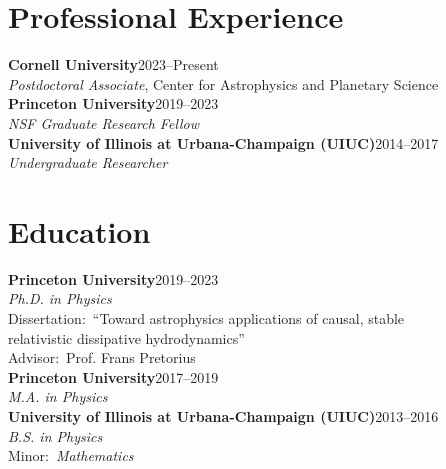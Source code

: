\documentclass[margin,line,11pt]{resume}
\edef\hc{\string:} %
\begin{document}
\begin{resume}

\section{\mysidestyle Professional Experience}

\textbf{Cornell University}\hfill 2023--Present\\
\textit{Postdoctoral Associate}, Center for Astrophysics and Planetary Science \vspace{2mm}\\
\textbf{Princeton University}\hfill 2019--2023\\
\textit{NSF Graduate Research Fellow} \vspace{2mm} \\
\textbf{University of Illinois at Urbana-Champaign (UIUC)}\hfill 2014--2017\\
\textit{Undergraduate Researcher}\\
\vspace{2mm}


\section{\mysidestyle Education}

\textbf{Princeton University}\hfill 2019--2023\\
\textit{Ph.D. in Physics}\\
Dissertation\hc \, ``Toward astrophysics applications of causal, stable \\ 
\hphantom{.}\hspace{24mm}relativistic dissipative hydrodynamics''\\
Advisor\hc ~Prof. Frans Pretorius \vspace{2mm}\\ 
\textbf{Princeton University}\hfill 2017--2019\\
\textit{M.A. in Physics}\vspace{2mm} \\ 
\textbf{University of Illinois at Urbana-Champaign (UIUC)}\hfill 2013--2016\\
\textit{B.S. in Physics}\\
Minor\hc ~\textit{Mathematics}
\vspace{2mm}
 


\end{resume}
\end{document}
